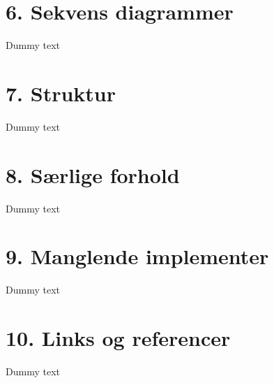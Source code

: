 \documentclass[11pt]{report}
\begin{document}
\newpage

\chapter*{6. Sekvens diagrammer}
Dummy text

\newpage

\chapter*{7. Struktur}
Dummy text

\newpage

\chapter*{8. Særlige forhold}
Dummy text

\newpage

\chapter*{9. Manglende implementer}
Dummy text

\newpage

\chapter*{10. Links og referencer}
Dummy text

\newpage
\end{document}
